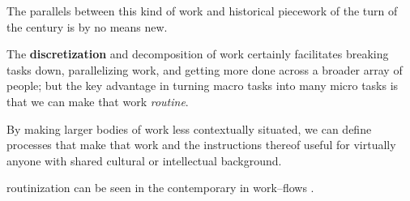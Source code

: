 \documentclass{sigchi}
\begin{document}
The parallels between this kind of work and
historical piecework of the turn of the  century
is by no means new.

The \textbf{discretization} and decomposition of work certainly facilitates
breaking tasks down,
parallelizing work,
and getting more done across a broader array of people;
but the key advantage in turning macro tasks 
into many micro tasks is that we can make that work \textit{routine}.

By making larger bodies of work less contextually situated,
we can define processes that make that work
and the instructions thereof
useful for virtually anyone with shared cultural or intellectual background.

routinization can be seen in the contemporary in work--flows
\cite{foundry,bernsteinSoylent}.












\end{document}
